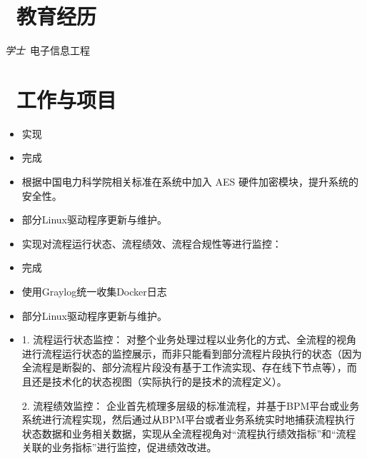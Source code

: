 \documentclass{resume}
\begin{document}
\normalsize { %
\section{\faGraduationCap\ 教育经历}
\textit{学士}\ 电子信息工程

\section{\faUsers\ 工作与项目}

\vspace{0.5ex}
\begin{itemize}
  \item 实现
  \item 完成 
  \item 根据中国电力科学院相关标准在系统中加入 AES 硬件加密模块，提升系统的安全性。
  \item 部分Linux驱动程序更新与维护。
\end{itemize}


\vspace{0.5ex}
\begin{itemize}
  \item 实现对流程运行状态、流程绩效、流程合规性等进行监控：
  \item 完成 
  \item 使用Graylog统一收集Docker日志
  \item 部分Linux驱动程序更新与维护。
  \item 1.	流程运行状态监控：
  对整个业务处理过程以业务化的方式、全流程的视角进行流程运行状态的监控展示，而非只能看到部分流程片段执行的状态（因为全流程是断裂的、部分流程片段没有基于工作流实现、存在线下节点等），而且还是技术化的状态视图（实际执行的是技术的流程定义）。
  
  2.	流程绩效监控：
  企业首先梳理多层级的标准流程，并基于BPM平台或业务系统进行流程实现，然后通过从BPM平台或者业务系统实时地捕获流程执行状态数据和业务相关数据，实现从全流程视角对“流程执行绩效指标”和“流程关联的业务指标”进行监控，促进绩效改进。
  

\end{itemize}}
\end{document}
